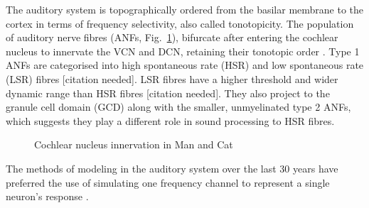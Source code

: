The auditory system is topographically ordered from the basilar
membrane to the cortex in terms of frequency selectivity, also called
tonotopicity.  The population of auditory nerve fibres (ANFs,
Fig.~\ref{fig:CNdiagram}), bifurcate after entering the cochlear
nucleus to innervate the VCN and DCN\@, retaining their tonotopic
order \citep{Lorente:1981}. Type 1 ANFs are categorised into high
spontaneous rate (HSR) and low spontaneous rate (LSR) fibres [citation needed]. LSR
fibres have a higher threshold and wider dynamic range than HSR fibres
[citation needed]. They also project to the granule cell domain (GCD)
\citep{RyugoParks:2003,RyugoHaenggeliEtAl:2003} along with the
smaller, unmyelinated type 2 ANFs, which suggests they play a
different role in sound processing to HSR fibres.

\medskip{}

\begin{figure}[tbh]
  \begin{center}
    \caption{Cochlear nucleus innervation in Man and Cat \citep[find out which publication printed this!][needs permission]{RyugoParks:2003,Ryugo:1992,Spoendlin:1973}}
    \label{fig:CNdiagram}
  \end{center}
\end{figure}


\medskip{}

 The methods of
modeling in the auditory system over the last 30 years have preferred
the use of simulating one frequency channel to represent a single
neuron's response \citep{DavisVoigt:1991,Carney:1993}.

\medskip{}

%
\medskip{}

